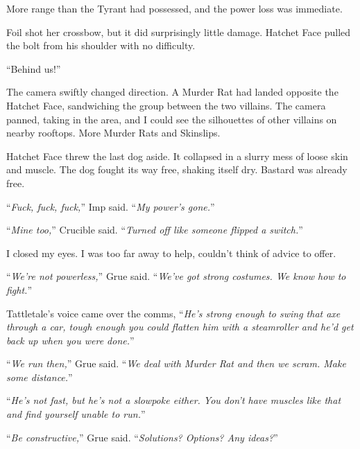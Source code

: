More range than the Tyrant had possessed, and the power loss was immediate.



Foil shot her crossbow, but it did surprisingly little damage.  Hatchet Face pulled the bolt from his shoulder with no difficulty.



``Behind us!''



The camera swiftly changed direction.  A Murder Rat had landed opposite the Hatchet Face, sandwiching the group between the two villains.  The camera panned, taking in the area, and I could see the silhouettes of other villains on nearby rooftops.  More Murder Rats and Skinslips.



Hatchet Face threw the last dog aside.  It collapsed in a slurry mess of loose skin and muscle.  The dog fought its way free, shaking itself dry.  Bastard was already free.



``\emph{Fuck, fuck, fuck,}'' Imp said.  ``\emph{My power's gone.}''



``\emph{Mine too,}'' Crucible said.  ``\emph{Turned off like someone flipped a switch.}''



I closed my eyes.  I was too far away to help, couldn't think of advice to offer.



``\emph{We're not powerless,}'' Grue said.  ``\emph{We've got strong costumes.  We know how to fight.}''



Tattletale's voice came over the comms, ``\emph{He's strong enough to swing that axe through a car, tough enough you could flatten him with a steamroller and he'd get back up when you were done.}''



``\emph{We run then,}'' Grue said.  ``\emph{We deal with Murder Rat and then we scram.  Make some distance.}''



``\emph{He's not fast, but he's not a slowpoke either.  You don't have muscles like that and find yourself unable to run.}''



``\emph{Be constructive,}'' Grue said.  ``\emph{Solutions?  Options?  Any ideas?}''



